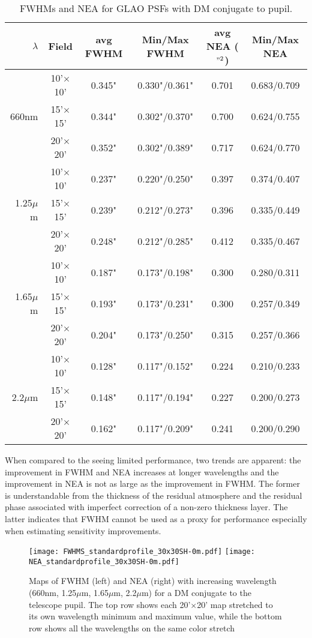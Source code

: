 \documentclass[aas_macros,10pt]{article}
\begin{document}
\begin{table}[ht]
\centering
\caption{FWHMs and NEA for GLAO PSFs with DM conjugate to pupil.}
\begin{tabular}{||r|c|c|c||c|c||} \hline\hline
$\lambda$ & Field & avg FWHM & Min/Max FWHM & avg NEA ($"^2$) & Min/Max NEA \\ \hline\hline
 		& 10'$\times$10' & 0.345" & 0.330"/0.361" & 0.701 & 0.683/0.709 \\ \cline{2-6}
 660nm 	& 15'$\times$15' & 0.344" & 0.302"/0.370" & 0.700 & 0.624/0.755 \\ \cline{2-6}
 		& 20'$\times$20' & 0.352" & 0.302"/0.389" & 0.717 & 0.624/0.770 \\ \hline\hline
		&  10'$\times$10' & 0.237" & 0.220"/0.250" & 0.397 & 0.374/0.407 \\ \cline{2-6}
1.25$\mu$m & 15'$\times$15' & 0.239" & 0.212"/0.273" & 0.396 & 0.335/0.449 \\ \cline{2-6}
		& 20'$\times$20' & 0.248" & 0.212"/0.285" & 0.412 & 0.335/0.467 \\ \hline\hline
		& 10'$\times$10' & 0.187" &  0.173"/0.198" & 0.300 & 0.280/0.311 \\ \cline{2-6}
1.65$\mu$m & 15'$\times$15' & 0.193" & 0.173"/0.231" & 0.300 & 0.257/0.349 \\ \cline{2-6}
		& 20'$\times$20' & 0.204" & 0.173"/0.250" & 0.315 & 0.257/0.366 \\ \hline\hline
		& 10'$\times$10' & 0.128" & 0.117"/0.152" & 0.224 & 0.210/0.233 \\ \cline{2-6}
2.2$\mu$m & 15'$\times$15' & 0.148" & 0.117"/0.194" & 0.227 & 0.200/0.273 \\ \cline{2-6}
		& 20'$\times$20' & 0.162" & 0.117"/0.209" & 0.241 & 0.200/0.290 \\ \hline \hline
\end{tabular}
\end{table}

When compared to the seeing limited performance, two trends are apparent: the improvement in 
FWHM and NEA increases at longer wavelengths and the improvement in NEA is not as large as the 
improvement in FWHM. The former is understandable from the thickness of the residual atmosphere 
and the residual phase associated with imperfect correction of a non-zero thickness layer. The 
latter indicates that FWHM cannot be used as a proxy for performance especially when estimating 
sensitivity improvements. 

\begin{figure}[ht]
\centering
\texttt{[image: FWHMS\_standardprofile\_30x30SH-0m.pdf]}
\texttt{[image: NEA\_standardprofile\_30x30SH-0m.pdf]}
\caption{Maps of FWHM (left) and NEA (right) with increasing wavelength (660nm, 1.25$\mu$m, 
1.65$\mu$m, 2.2$\mu$m) for a DM conjugate to the telescope pupil. The top row shows each 20'$\times$20' 
map stretched to its own wavelength minimum and maximum value, while the bottom row shows all the 
wavelengths on the same color stretch}
\label{fig:0mconjugation}
\end{figure}
\end{document}
